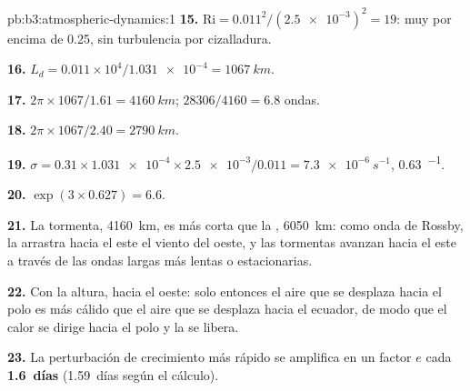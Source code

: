 \begin{solution}{pb:b3:atmospheric-dynamics:1}
\textbf{15.} $\mathrm{Ri} = 0.011^2/(\num{2.5e-3})^2 = 19$: muy por encima de 0.25,
sin turbulencia por cizalladura.

\textbf{16.} $L_d = 0.011\times10^4/\num{1.031e-4} = \qty{1067}{km}$.

\textbf{17.} $2\pi\times1067/1.61 = \qty{4160}{km}$; $28306/4160 = 6.8$
ondas.

\textbf{18.} $2\pi\times1067/2.40 = \qty{2790}{km}$.

\textbf{19.} $\sigma = 0.31\times\num{1.031e-4}\times\num{2.5e-3}/0.011 =
\qty{7.3e-6}{s^{-1}}$, \qty{0.63}{^{-1}}.

\textbf{20.} $\exp(3\times0.627) = 6.6$.

\textbf{21.} La tormenta, \qty{4160}{km}, es más corta que la , \qty{6050}{km}: como onda de Rossby, la arrastra hacia el este el
viento del oeste, y las tormentas avanzan hacia el este a través de las ondas largas
más lentas o estacionarias.

\textbf{22.} Con la altura, hacia el oeste: solo entonces el aire que se desplaza hacia el polo es
más cálido que el aire que se desplaza hacia el ecuador, de modo que el calor se dirige hacia el polo y la
 se libera.

\textbf{23.} La perturbación de crecimiento más rápido se amplifica en un factor $e$ cada
\textbf{\num[text-series-to-math=true]{1.6}~días} (\num{1.59}~días según el
cálculo).
\end{solution}
